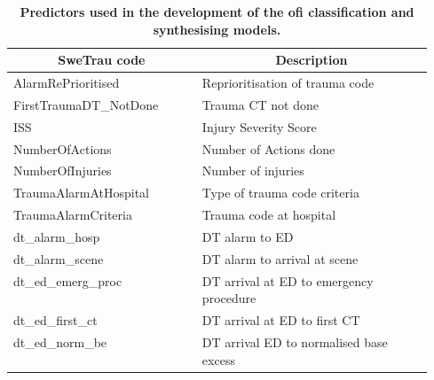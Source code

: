 \documentclass[12pt, a4paper]{article}
\begin{document}
\begin{appendices}
    \renewcommand*{\arraystretch}{1.2}
    \begin{longtable}[c]{@{}|l|p{0.55\linewidth}|@{}}
        \caption{\textbf{Predictors used in the development of the \acrlong{ofi} classification and synthesising models.}}%
        \label{tab:predictors}                                                                                          \\
        \hline
        \multicolumn{1}{|c|}{\textbf{SweTrau code}} & \multicolumn{1}{|c|}{\textbf{Description}}                        \\\hline
        \endfirsthead
        \endhead
        AlarmRePrioritised                          & Reprioritisation of trauma code                                   \\\hline
        FirstTraumaDT\_NotDone                      & Trauma CT not done                                                \\\hline
        ISS                                         & Injury Severity Score                                             \\\hline
        NumberOfActions                             & Number of Actions done                                            \\\hline
        NumberOfInjuries                            & Number of injuries                                                \\\hline
        TraumaAlarmAtHospital                       & Type of trauma code criteria                                      \\\hline
        TraumaAlarmCriteria                         & Trauma code at hospital                                           \\\hline
        dt\_alarm\_hosp                             & DT alarm to ED                                                    \\\hline
        dt\_alarm\_scene                            & DT alarm to arrival at scene                                      \\\hline
        dt\_ed\_emerg\_proc                         & DT arrival at ED to emergency procedure                           \\\hline
        dt\_ed\_first\_ct                           & DT arrival at ED to first CT                                      \\\hline
        dt\_ed\_norm\_be                            & DT arrival ED to normalised base excess                           \\\hline

\end{longtable}
\end{appendices}
\end{document}
